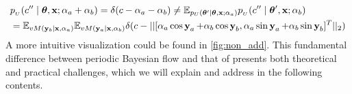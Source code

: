 \begin{align}
\label{eq:nonadd}
     &p_{_U}(c'' \mid \boldsymbol{\theta}, \operatorname{\mathbf{x}}; \alpha_a+\alpha_b)  = \delta(c-\alpha_a-\alpha_b)
     \ne  \mathbb{E}_{p_U(\boldsymbol{\theta}' \mid \boldsymbol{\theta}, \operatorname{\mathbf{x}}; \alpha_a)}p_{_U}(c'' \mid \boldsymbol{\theta}', \operatorname{\mathbf{x}}; \alpha_b) \nonumber \\&= \mathbb{E}_{vM(\bold{y}_b|\bold{x},\alpha_a)}\mathbb{E}_{vM(\bold{y}_a|\bold{x},\alpha_b)}\delta(c-||[\alpha_a \cos\operatorname{\mathbf{y}}_a+\alpha_b\cos \operatorname{\mathbf{y}}_b,\alpha_a \sin\operatorname{\mathbf{y}}_a+\alpha_b\sin \operatorname{\mathbf{y}}_b]^T||_2)
\end{align}
A more intuitive visualization could be found in \cref{fig:non_add}. This fundamental difference between periodic Bayesian flow and that of \citet{bfn} presents both theoretical and practical challenges, which we will explain and address in the following contents.





